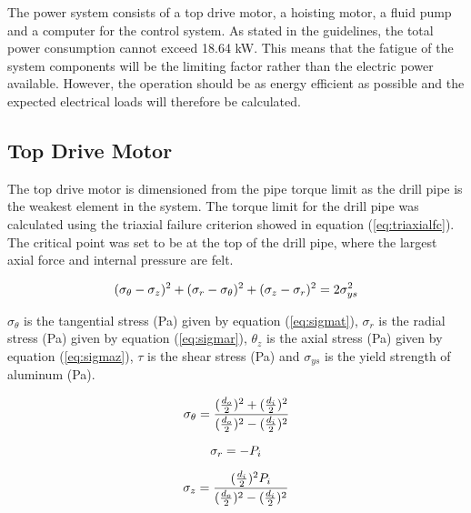 The power system consists of a top drive motor, a hoisting motor, a fluid pump and a computer for the control system. As stated in the guidelines, the total power consumption cannot exceed 18.64 kW. This means that the fatigue of the system components will be the limiting factor rather than the electric power available. However, the operation should be as energy efficient as possible and the expected electrical loads will therefore be calculated.   



\subsection{Top Drive Motor}
The top drive motor is dimensioned from the pipe torque limit as the drill pipe is the weakest element in the system. The torque limit for the drill pipe was calculated using the triaxial failure criterion showed in equation (\ref{eq:triaxialfc}). The critical point was set to be at the top of the drill pipe, where the largest axial force and internal pressure are felt. 


\begin{equation}
\centering
   (\sigma_\theta - \sigma_z)^2 + (\sigma_r - \sigma_\theta)^2 + (\sigma_z - \sigma_r)^2 = 2\sigma_{ys}^2
\label{eq:triaxialfc}
\end{equation}

$\sigma_\theta$ is the tangential stress (Pa) given by equation (\ref{eq:sigmat}), $\sigma_r$ is the radial stress (Pa) given by equation (\ref{eq:sigmar}), $\theta_z$ is the axial stress (Pa) given by equation (\ref{eq:sigmaz}), $\tau$ is the shear stress (Pa) and $\sigma_{ys}$ is the yield strength of aluminum (Pa).

\begin{equation}
\centering
   \sigma_\theta=\frac{(\frac{d_o}{2})^2+(\frac{d_i}{2})^2}{(\frac{d_o}{2})^2-(\frac{d_i}{2})^2}
\label{eq:sigmat}
\end{equation}

\begin{equation}
\centering
   \sigma_r=-P_i
\label{eq:sigmar}
\end{equation}

\begin{equation}
\centering
   \sigma_z=\frac{(\frac{d_i}{2})^2 P_i}{(\frac{d_o}{2})^2-(\frac{d_i}{2})^2}
\label{eq:sigmaz}
\end{equation}

